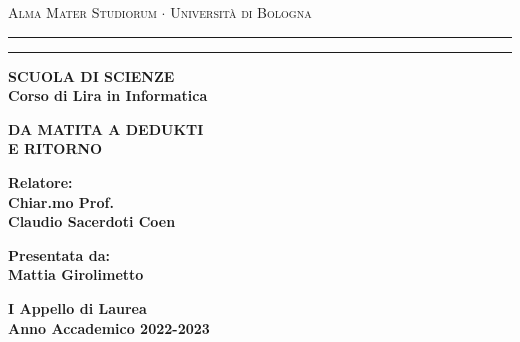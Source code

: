 \documentclass[12pt,a4paper]{report}
\begin{document}
\begin{titlepage}
  \begin{center}
    {{
      \Large{\textsc{Alma Mater Studiorum $\cdot$ Universit\`a di Bologna}}
    }} \rule[0.1cm]{15.8cm}{0.1mm}
    \rule[0.5cm]{15.8cm}{0.6mm}
    {\small{\bf SCUOLA DI SCIENZE\\
    Corso di Lira in Informatica}}
  \end{center}
  \vspace{15mm}
  \begin{center}
    {\LARGE{\bf DA MATITA A DEDUKTI}}\\
    \vspace{3mm}
    {\LARGE{\bf E RITORNO}}\\
  \end{center}
  \vspace{40mm}
  \par
  \noindent
  \begin{minipage}[t]{0.47\textwidth}
  {\large{\bf Relatore:\\
  Chiar.mo Prof.\\ %
  Claudio Sacerdoti Coen}}
  \end{minipage}
  \hfill
  \begin{minipage}[t]{0.47\textwidth}\raggedleft
  {\large{\bf Presentata da:\\
  Mattia Girolimetto}}
  \end{minipage}
  \vspace{20mm}
  \begin{center}
  {\large{\bf I Appello di Laurea\\%
  Anno Accademico 2022-2023}}%
  \end{center}
\end{titlepage}


\begin{abstract}
\end{abstract}

\tableofcontents
\end{document}
